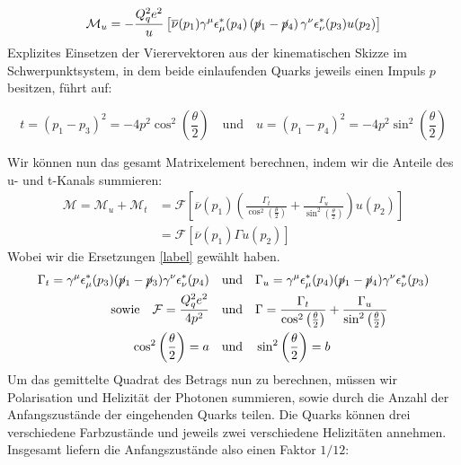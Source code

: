 \begin{equation}
	\mathcal{M}_u = -\frac{Q_q^2e^2}{u}\left[ \overline{\nu}(p_1) \gamma^\mu \epsilon^*_\mu(p_4) \left(\cancel{p}_1 - \cancel{p}_4\right) \gamma^\nu \epsilon^*_\nu(p_3) u(p_2)\right]
\end{equation}
Explizites Einsetzen der Vierervektoren aus der kinematischen Skizze im Schwerpunktsystem, in dem beide einlaufenden Quarks jeweils einen Impuls $p$ besitzen, führt auf:

\begin{equation}
	t = \left(p_1 -p_3\right)^2 = -4 p^2 \cos^2\left(\frac{\theta}{2}\right) \quad \text{und} \quad u = (p_1-p_4)^2 = -4p^2 \sin^2\left(\frac{\theta}{2}\right)
\end{equation} 

Wir können nun das gesamt Matrixelement berechnen, indem wir die Anteile des u- und t-Kanals summieren:
\begin{equation}
	\begin{aligned}
	     \mathcal{M} = \mathcal{M}_u + \mathcal{M}_t &= \mathcal{F} \left[\overline{\nu}(p_1) \left(\frac{\Gamma_t}{\cos^2\left(\frac{\theta}{2}\right)}  +
	     \frac{\Gamma_u}{\sin^2\left(\frac{\theta}{2}\right)} \right) u(p_2) \right] \\
	     &= \mathcal{F} \left[ \overline{\nu}(p_1) \Gamma u(p_2)\right]
	\end{aligned}
\end{equation}
Wobei wir die Ersetzungen \autoref{label} gewählt haben.
\begin{equation}
	\begin{split}
		\Gamma_t = \gamma^\mu \epsilon^*_\mu(p_3) (\cancel{p}_1- \cancel{p}_3)  \gamma^\nu \epsilon_\nu^*(p_4) \quad &\text{und} \quad \Gamma_u = \gamma^\mu \epsilon^*_\mu(p_4) (\cancel{p}_1- \cancel{p}_4)  \gamma^\nu \epsilon_\nu^*(p_3) \\
		\text{sowie} \quad \mathcal{F} = \frac{Q_q^2e^2}{4p^2} \quad &\text{und} \quad \Gamma = \frac{\Gamma_t}{\cos^2\left(\frac{\theta}{2}\right)}  +
		\frac{\Gamma_u}{\sin^2\left(\frac{\theta}{2}\right)} \\
		\cos^2\left(\frac{\theta}{2}\right) = a \quad &\text{und} \quad \sin^2\left(\frac{\theta}{2}\right) = b
	\end{split}
\end{equation}
Um das gemittelte Quadrat des Betrags nun zu berechnen, müssen wir Polarisation und Helizität der Photonen summieren, sowie durch die Anzahl der Anfangszustände der eingehenden Quarks teilen. Die Quarks können drei verschiedene Farbzustände und jeweils zwei verschiedene Helizitäten annehmen. Insgesamt liefern die Anfangszustände also einen Faktor $1/12$:
